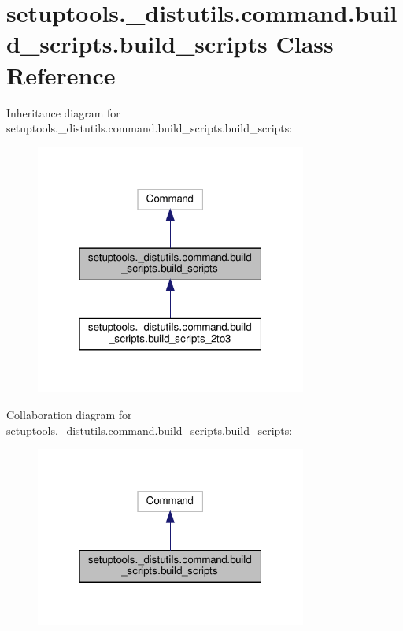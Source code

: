 \hypertarget{classsetuptools_1_1__distutils_1_1command_1_1build__scripts_1_1build__scripts}{}\section{setuptools.\+\_\+distutils.\+command.\+build\+\_\+scripts.\+build\+\_\+scripts Class Reference}
\label{classsetuptools_1_1__distutils_1_1command_1_1build__scripts_1_1build__scripts}


Inheritance diagram for setuptools.\+\_\+distutils.\+command.\+build\+\_\+scripts.\+build\+\_\+scripts\+:
\nopagebreak
\begin{figure}[H]
\begin{center}
\leavevmode
\includegraphics[width=253pt]{classsetuptools_1_1__distutils_1_1command_1_1build__scripts_1_1build__scripts__inherit__graph}
\end{center}
\end{figure}


Collaboration diagram for setuptools.\+\_\+distutils.\+command.\+build\+\_\+scripts.\+build\+\_\+scripts\+:
\nopagebreak
\begin{figure}[H]
\begin{center}
\leavevmode
\includegraphics[width=253pt]{classsetuptools_1_1__distutils_1_1command_1_1build__scripts_1_1build__scripts__coll__graph}
\end{center}
\end{figure}
